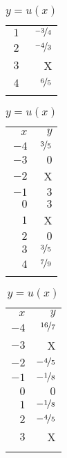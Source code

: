 \begin{exercises}
\begin{problem}
\begin{table}[!htb]
\begin{widepage}
\begin{subtable}{.2\textwidth}
\begin{tabular}{rr}
 				$1$  & $\nicefrac{-3}{4}$  \\\normalline
 				$2$  & $\nicefrac{-4}{3}$  \\\normalline
 				$3$  & X                   \\\normalline
 				$4$  & $\nicefrac{6}{5}$   \\\lastline
 			\end{tabular}
 		\end{subtable}
 		\hfill
 		\begin{subtable}{.2\textwidth}
 			\centering
 			\caption{$y=t(x)$}
 			\label{rat:tab:findformulat}
 			\begin{tabular}{rr}
 				\beforeheading
 				$x$  & $y$               \\ \afterheading
 				$-4$ & $\nicefrac{3}{5}$ \\\normalline
 				$-3$ & $0$               \\\normalline
 				$-2$ & X                 \\\normalline
 				$-1$ & $3$               \\\normalline
 				$0$  & $3$               \\\normalline
 				$1$  & X                 \\\normalline
 				$2$  & $0$               \\\normalline
 				$3$  & $\nicefrac{3}{5}$ \\\normalline
 				$4$  & $\nicefrac{7}{9}$ \\\lastline
 			\end{tabular}
 		\end{subtable}
 		\hfill
 		\begin{subtable}{.2\textwidth}
 			\centering
 			\caption{$y=u(x)$}
 			\label{rat:tab:findformulau}
 			\begin{tabular}{rr}
 				\beforeheading
 				$x$  & $y$                \\ \afterheading
 				$-4$ & $\nicefrac{16}{7}$ \\\normalline
 				$-3$ & X                  \\\normalline
 				$-2$ & $-\nicefrac{4}{5}$ \\\normalline
 				$-1$ & $-\nicefrac{1}{8}$ \\\normalline
 				$0$  & $0$                \\\normalline
 				$1$  & $-\nicefrac{1}{8}$ \\\normalline
 				$2$  & $-\nicefrac{4}{5}$ \\\normalline
 				$3$  & X                  \\\normalline

\end{tabular}
\end{subtable}
\end{widepage}
\end{table}
\end{problem}
\end{exercises}
